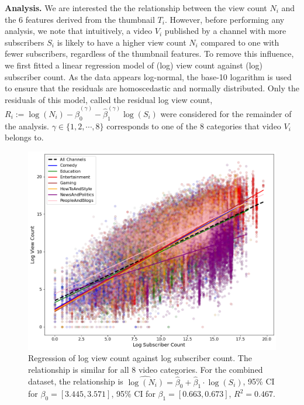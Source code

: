 \documentclass{article}
\begin{document}
\textbf{Analysis.} We are interested the the relationship between the view count $N_i$ and the 6 features derived from the thumbnail $T_i$. However, before performing any analysis, we note that intuitively, a video $V_i$ published by a channel with more subscribers $S_i$ is likely to have a higher view count $N_i$ compared to one with fewer subscribers, regardless of the thumbnail features. To remove this influence, we first fitted a linear regression model of (log) view count against (log) subscriber count. As the data appears log-normal, the base-10 logarithm is used to ensure that the residuals are homoscedastic and normally distributed. Only the residuals of this model, called the residual log view count, $R_{i} := \log(N_i) - \hat{\beta}_0^{(\gamma)} - \hat{\beta}_1^{(\gamma)} \log(S_i)$ were considered for the remainder of the analysis. $\gamma \in \{1, 2, \cdots, 8\}$ corresponds to one of the 8 categories that video $V_i$ belongs to.


\begin{figure}[h]
  \begin{minipage}[t]{0.45\textwidth}
    \vspace{0pt}  %
    \includegraphics[width=\textwidth]{figs/subscriber.png}
  \end{minipage}%
  \hspace{0.05\textwidth}%
  \begin{minipage}[t]{0.45\textwidth}
    \vspace{0pt}  %
    \caption{Regression of log view count against log subscriber count. The relationship is similar for all 8 video categories.
    For the combined dataset, the relationship is $\widehat{\log(N_i)} = \hat{\beta}_0 + \hat{\beta}_1 \cdot \log(S_i)$, 95\% CI for $\beta_0 = [3.445, 3.571]$, 95\% CI for $\beta_1 = [0.663, 0.673]$, $R^2 = 0.467$.}
    \label{fig:scatter_plot}

  \end{minipage}
\end{figure}
\end{document}
